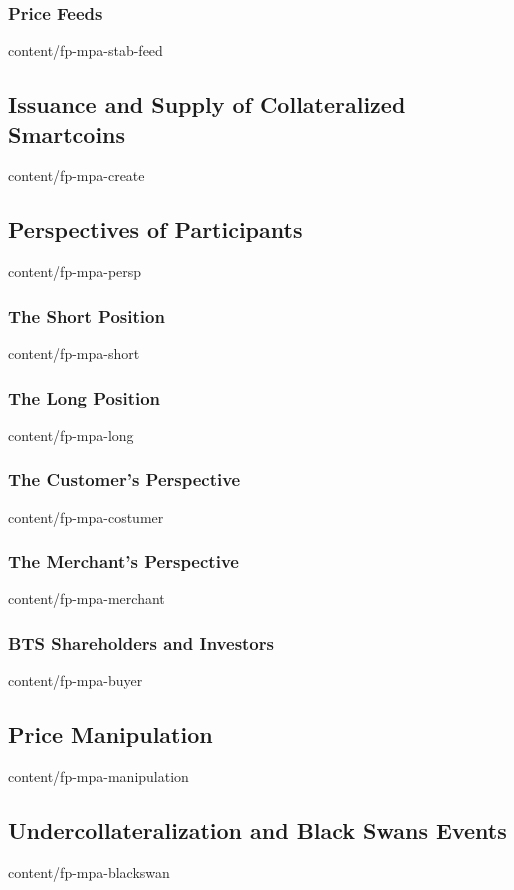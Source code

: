 \documentclass[conference,final,10pt,a4paper]{IEEEtran}
\begin{document}
\subsubsection  { Price Feeds                                      }  { content/fp-mpa-stab-feed       } 
\subsection     { Issuance and Supply of Collateralized Smartcoins }  { content/fp-mpa-create          } 
\subsection     { Perspectives of Participants                     }  { content/fp-mpa-persp           } 
\subsubsection  { The Short Position                               }  { content/fp-mpa-short           } 
\subsubsection  { The Long Position                                }  { content/fp-mpa-long            } 
\subsubsection  { The Customer's Perspective                       }  { content/fp-mpa-costumer        } 
\subsubsection  { The Merchant's Perspective                       }  { content/fp-mpa-merchant        } 
\subsubsection  { BTS Shareholders and Investors                   }  { content/fp-mpa-buyer           } 
\subsection     { Price Manipulation                               }  { content/fp-mpa-manipulation    } 
\subsection     { Undercollateralization and Black Swans Events    }  { content/fp-mpa-blackswan       } 
\end{document}
